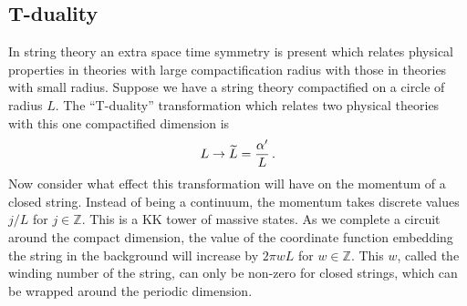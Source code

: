 

\subsection{T-duality}
\label{sec:tduality-dbiintro}
In string theory an extra space time symmetry is present which relates physical properties in
theories with large compactification radius with those in theories with small radius. 
Suppose we have a string theory compactified on a circle of radius $L$. The ``T-duality''
transformation which relates two physical theories with this one compactified dimension is
% 
\begin{equation}
\label{eq:tdualtransform-dbiintro}
 L \rightarrow \widetilde{L} = \frac{\alpha'}{L}\,.
\end{equation}
% 
Now consider what effect this transformation will have on the momentum of a closed string. Instead
of being a continuum, the momentum takes discrete values
$j/L$ for $j \in \mathbb{Z}$. This is a KK tower of massive states. As we
complete a circuit around the compact dimension, the value of the coordinate
function embedding the string in the background will increase by $2\pi w
L$ for $w \in \mathbb{Z}$. This $w$, called the winding number of the string,
can only be non-zero for closed strings, which can be wrapped around the periodic
dimension.

